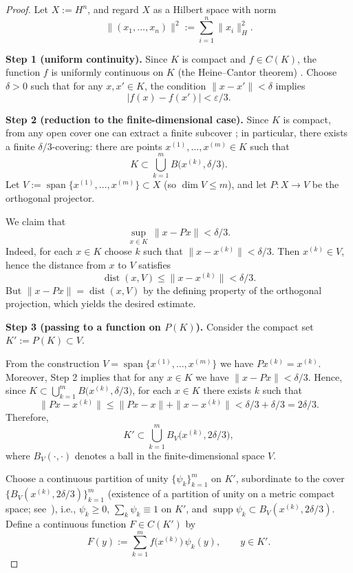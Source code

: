 \documentclass[final,12pt]{colt2026} %
\begin{document}
\begin{proof}
Let $X:=H^n$, and regard $X$ as a Hilbert space with norm
\[
  \|(x_1,\dots,x_n)\|^2:=\sum_{i=1}^n\|x_i\|_H^2.
\]

\textbf{Step 1 (uniform continuity).} Since $K$ is compact and $f\in C(K)$, the function $f$ is uniformly continuous on $K$ (the Heine--Cantor theorem) \cite{rudin_principles}. Choose $\delta>0$ such that for any $x,x'\in K$, the condition $\|x-x'\|<\delta$ implies
\[
  |f(x)-f(x')|<\varepsilon/3.
\]

\textbf{Step 2 (reduction to the finite-dimensional case).} Since $K$ is compact, from any open cover one can extract a finite subcover \cite{munkres_topology}; in particular, there exists a finite $\delta/3$-covering: there are points $x^{(1)},\dots,x^{(m)}\in K$ such that
\[
  K\subset \bigcup_{k=1}^m B\bigl(x^{(k)},\delta/3\bigr).
\]
Let $V:=\operatorname{span}\{x^{(1)},\dots,x^{(m)}\}\subset X$ (so $\dim V\le m$), and let $P\colon X\to V$ be the orthogonal projector.

We claim that
\[
  \sup_{x\in K}\,\|x-Px\|<\delta/3.
\]
Indeed, for each $x\in K$ choose $k$ such that $\|x-x^{(k)}\|<\delta/3$. Then $x^{(k)}\in V$, hence the distance from $x$ to $V$ satisfies
\[
  \operatorname{dist}(x,V)\le \|x-x^{(k)}\|<\delta/3.
\]
But $\|x-Px\|=\operatorname{dist}(x,V)$ by the defining property of the orthogonal projection, which yields the desired estimate.

\textbf{Step 3 (passing to a function on $P(K)$).} Consider the compact set $K':=P(K)\subset V$.

From the construction $V=\operatorname{span}\{x^{(1)},\dots,x^{(m)}\}$ we have $P x^{(k)}=x^{(k)}$.
Moreover, Step 2 implies that for any $x\in K$ we have $\|x-Px\|<\delta/3$. Hence, since $K\subset\bigcup_{k=1}^m B\bigl(x^{(k)},\delta/3\bigr)$, for each $x\in K$ there exists $k$ such that
\[
  \|Px-x^{(k)}\|\le \|Px-x\|+\|x-x^{(k)}\|<\delta/3+\delta/3=2\delta/3.
\]
Therefore,
\[
  K'\subset \bigcup_{k=1}^m B_V\bigl(x^{(k)},2\delta/3\bigr),
\]
where $B_V(\cdot,\cdot)$ denotes a ball in the finite-dimensional space $V$.

Choose a continuous partition of unity $\{\psi_k\}_{k=1}^m$ on $K'$, subordinate to the cover $\{B_V(x^{(k)},2\delta/3)\}_{k=1}^m$ (existence of a partition of unity on a metric compact space; see\ \cite{munkres_topology}), i.e., $\psi_k\ge 0$, $\sum_k\psi_k\equiv 1$ on $K'$, and $\operatorname{supp}\psi_k\subset B_V(x^{(k)},2\delta/3)$.
Define a continuous function $F\in C(K')$ by
\[
  F(y):=\sum_{k=1}^m f\bigl(x^{(k)}\bigr)\,\psi_k(y),\qquad y\in K'.
\]


\end{proof}
\end{document}
